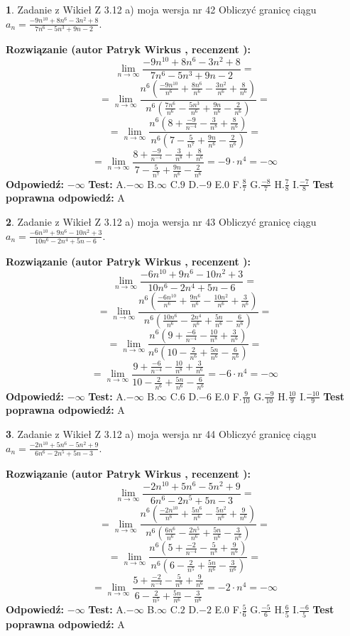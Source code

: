 \documentclass[12pt, a4paper]{article}
\theoremstyle{definition} %
\newtheorem{zad}{}
\newcommand{\zadStart}[1]{\begin{zad}#1\newline}
\newcommand{\zadStop}{\end{zad}}
\newcommand{\rozwStart}[2]{\noindent \textbf{Rozwiązanie (autor #1 , recenzent #2): }\newline}
\newcommand{\rozwStop}{\newline}
\newcommand{\odpStart}{\noindent \textbf{Odpowiedź:}\newline}
\newcommand{\odpStop}{\newline}
\newcommand{\testStart}{\noindent \textbf{Test:}\newline}
\newcommand{\testStop}{\newline}
\newcommand{\kluczStart}{\noindent \textbf{Test poprawna odpowiedź:}\newline}
\newcommand{\kluczStop}{\newline}
\begin{document}
\zadStart{Zadanie z Wikieł Z 3.12 a) moja wersja nr 42}
Obliczyć granicę ciągu $a_{n}=\frac{-9n^{10}+8n^{6}-3n^{2}+8}{7n^{6}-5n^{3}+9n-2}$.
\zadStop
\rozwStart{Patryk Wirkus}{}
$$\lim\limits_{n\to\infty}\frac{-9n^{10}+8n^{6}-3n^{2}+8}{7n^{6}-5n^{3}+9n-2}=$$
$$=\lim\limits_{n\to\infty}\frac{n^{6}\left(\frac{-9n^{10}}{n^{6}}+\frac{8n^{6}}{n^{6}}-\frac{3n^{2}}{n^{6}}+\frac{8}{n^{6}}\right)}{n^{6}\left(\frac{7n^{6}}{n^{6}}-\frac{5n^{3}}{n^{6}}+\frac{9n}{n^{6}}-\frac{2}{n^{6}}\right)}=$$
$$=\lim\limits_{n\to\infty}\frac{n^{6}\left(8+\frac{-9}{n^{-4}}-\frac{3}{n^{8}}+\frac{8}{n^{6}}\right)}
{n^{6}\left(7-\frac{5}{n^{7}}+\frac{9n}{n^{6}}-\frac{2}{n^{6}}\right)}=$$
$$=\lim\limits_{n\to\infty}\frac{8+\frac{-9}{n^{-4}}-\frac{3}{n^{8}}+\frac{8}{n^{6}}}{7-\frac{5}{n^{7}}+\frac{9n}{n^{6}}-\frac{2}{n^{6}}}=-9\cdot n^{4} = -\infty$$
\rozwStop
\odpStart
$-\infty$
\odpStop
\testStart
A.$-\infty$
B.$\infty$
C.$9$
D.$-9$
E.$0$
F.$\frac{8}{7}$
G.$\frac{-8}{7}$
H.$\frac{7}{8}$
I.$\frac{-7}{8}$
\testStop
\kluczStart
A
\kluczStop



\zadStart{Zadanie z Wikieł Z 3.12 a) moja wersja nr 43}
Obliczyć granicę ciągu $a_{n}=\frac{-6n^{10}+9n^{6}-10n^{2}+3}{10n^{6}-2n^{4}+5n-6}$.
\zadStop
\rozwStart{Patryk Wirkus}{}
$$\lim\limits_{n\to\infty}\frac{-6n^{10}+9n^{6}-10n^{2}+3}{10n^{6}-2n^{4}+5n-6}=$$
$$=\lim\limits_{n\to\infty}\frac{n^{6}\left(\frac{-6n^{10}}{n^{6}}+\frac{9n^{6}}{n^{6}}-\frac{10n^{2}}{n^{6}}+\frac{3}{n^{6}}\right)}{n^{6}\left(\frac{10n^{6}}{n^{6}}-\frac{2n^{4}}{n^{6}}+\frac{5n}{n^{6}}-\frac{6}{n^{6}}\right)}=$$
$$=\lim\limits_{n\to\infty}\frac{n^{6}\left(9+\frac{-6}{n^{-4}}-\frac{10}{n^{8}}+\frac{3}{n^{6}}\right)}
{n^{6}\left(10-\frac{2}{n^{6}}+\frac{5n}{n^{6}}-\frac{6}{n^{6}}\right)}=$$
$$=\lim\limits_{n\to\infty}\frac{9+\frac{-6}{n^{-4}}-\frac{10}{n^{8}}+\frac{3}{n^{6}}}{10-\frac{2}{n^{6}}+\frac{5n}{n^{6}}-\frac{6}{n^{6}}}=-6\cdot n^{4} = -\infty$$
\rozwStop
\odpStart
$-\infty$
\odpStop
\testStart
A.$-\infty$
B.$\infty$
C.$6$
D.$-6$
E.$0$
F.$\frac{9}{10}$
G.$\frac{-9}{10}$
H.$\frac{10}{9}$
I.$\frac{-10}{9}$
\testStop
\kluczStart
A
\kluczStop



\zadStart{Zadanie z Wikieł Z 3.12 a) moja wersja nr 44}
Obliczyć granicę ciągu $a_{n}=\frac{-2n^{10}+5n^{6}-5n^{2}+9}{6n^{6}-2n^{5}+5n-3}$.
\zadStop
\rozwStart{Patryk Wirkus}{}
$$\lim\limits_{n\to\infty}\frac{-2n^{10}+5n^{6}-5n^{2}+9}{6n^{6}-2n^{5}+5n-3}=$$
$$=\lim\limits_{n\to\infty}\frac{n^{6}\left(\frac{-2n^{10}}{n^{6}}+\frac{5n^{6}}{n^{6}}-\frac{5n^{2}}{n^{6}}+\frac{9}{n^{6}}\right)}{n^{6}\left(\frac{6n^{6}}{n^{6}}-\frac{2n^{5}}{n^{6}}+\frac{5n}{n^{6}}-\frac{3}{n^{6}}\right)}=$$
$$=\lim\limits_{n\to\infty}\frac{n^{6}\left(5+\frac{-2}{n^{-4}}-\frac{5}{n^{8}}+\frac{9}{n^{6}}\right)}
{n^{6}\left(6-\frac{2}{n^{5}}+\frac{5n}{n^{6}}-\frac{3}{n^{6}}\right)}=$$
$$=\lim\limits_{n\to\infty}\frac{5+\frac{-2}{n^{-4}}-\frac{5}{n^{8}}+\frac{9}{n^{6}}}{6-\frac{2}{n^{5}}+\frac{5n}{n^{6}}-\frac{3}{n^{6}}}=-2\cdot n^{4} = -\infty$$
\rozwStop
\odpStart
$-\infty$
\odpStop
\testStart
A.$-\infty$
B.$\infty$
C.$2$
D.$-2$
E.$0$
F.$\frac{5}{6}$
G.$\frac{-5}{6}$
H.$\frac{6}{5}$
I.$\frac{-6}{5}$
\testStop
\kluczStart
A
\kluczStop
\end{document}
